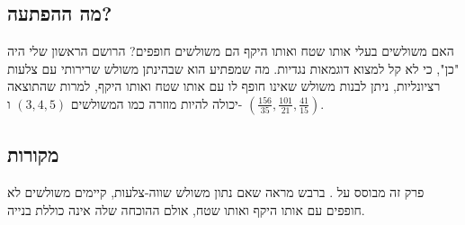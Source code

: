 \subsection*{מה ההפתעה?}

האם משולשים בעלי אותו שטח ואותו היקף הם משולשים חופפים? הרושם הראשון שלי היה "כן", כי לא קל למצוא דוגמאות נגדיות. מה שמפתיע הוא שבהינתן משולש שרירותי עם צלעות רציונליות, ניתן לבנות משולש שאינו חופף לו עם אותו שטח ואותו היקף, למרות שהתוצאה יכולה להיות מוזרה כמו המשולשים
$(3,4,5)$
ו-%
$\left(\frac{156}{35}, \frac{101}{21}, \frac{41}{15}\right)$.


\subsection*{מקורות}

פרק זה מבוסס על 
\cite{mccallum}.
ברבש
\cite{marita}
מראה שאם נתון משולש שווה-צלעות, קיימים משולשים לא חופפים עם אותו היקף ואותו שטח, אולם ההוכחה שלה אינה כוללת בנייה. 
